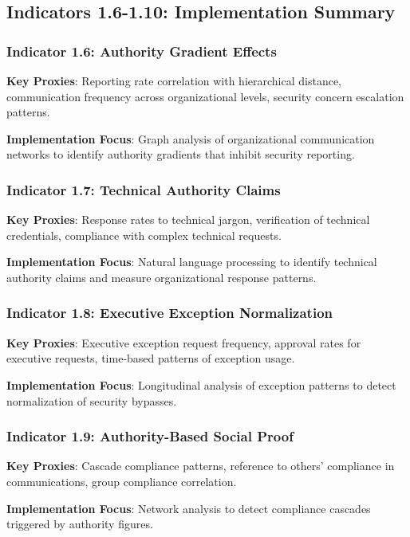 \documentclass[11pt, onecolumn]{article}
\begin{document}
\subsection{Indicators 1.6-1.10: Implementation Summary}

\subsubsection{Indicator 1.6: Authority Gradient Effects}

\textbf{Key Proxies}: Reporting rate correlation with hierarchical distance, communication frequency across organizational levels, security concern escalation patterns.

\textbf{Implementation Focus}: Graph analysis of organizational communication networks to identify authority gradients that inhibit security reporting.

\subsubsection{Indicator 1.7: Technical Authority Claims}

\textbf{Key Proxies}: Response rates to technical jargon, verification of technical credentials, compliance with complex technical requests.

\textbf{Implementation Focus}: Natural language processing to identify technical authority claims and measure organizational response patterns.

\subsubsection{Indicator 1.8: Executive Exception Normalization}

\textbf{Key Proxies}: Executive exception request frequency, approval rates for executive requests, time-based patterns of exception usage.

\textbf{Implementation Focus}: Longitudinal analysis of exception patterns to detect normalization of security bypasses.

\subsubsection{Indicator 1.9: Authority-Based Social Proof}

\textbf{Key Proxies}: Cascade compliance patterns, reference to others' compliance in communications, group compliance correlation.

\textbf{Implementation Focus}: Network analysis to detect compliance cascades triggered by authority figures.
\end{document}
